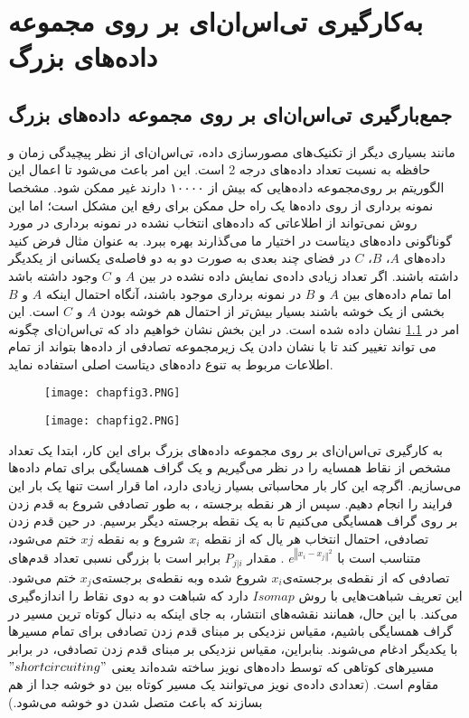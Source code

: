 \chapter{ به‌کارگیری تی‌اس‌ان‌ای بر روی مجموعه داده‌های بزرگ}
\section*{جمع‌بارگیری تی‌اس‌ان‌ای بر روی مجموعه داده‌های بزرگ}
مانند بسیاری دیگر از تکنیک‌های مصورسازی داده، تی‌اس‌ان‌ای از نظر پیچیدگی زمان و حافظه به نسبت تعداد داده‌های درجه 2 است. این امر باعث می‌شود تا اعمال این الگوریتم بر روی‌مجموعه داده‌هایی که بیش از ۱۰۰۰۰ دارند غیر ممکن شود. مشخصا نمونه برداری از روی داده‌ها یک راه حل ممکن برای رفع این مشکل است؛ اما این روش نمی‌تواند از اطلاعاتی که داده‌های انتخاب نشده در نمونه برداری در مورد گوناگونی داده‌های دیتاست در اختیار ما می‌گذارند بهره ببرد. به عنوان مثال فرض کنید داده‌های
 $A$، $B$، $C$
  در فضای چند بعدی به صورت دو به دو فاصله‌ی یکسانی از یکدیگر داشته باشند. اگر تعداد زیادی داده‌ی نمایش داده نشده در بین $A$ و $C$ وجود داشته باشد اما تمام داده‌های بین $A$ و $B$ در نمونه برداری موجود باشند، آنگاه احتمال اینکه $A$ و $B$ بخشی از یک خوشه باشند بسیار بیش‌تر از احتمال هم خوشه بودن $A$ و $C$ است. این امر در \cref{chapfig3} نشان داده شده است. در این بخش نشان خواهیم داد که تی‌اس‌ان‌ای چگونه می تواند تغییر کند تا با نشان دادن یک زیرمجموعه تصادفی از داده‌ها بتواند از تمام اطلاعات مربوط به تنوع داده‌های دیتاست اصلی استفاده نماید.
\\

\begin{figure}
	\centering\texttt{[image: chapfig3.PNG]}
	\caption{ }\label{chapfig3}
\end{figure}
\begin{figure}
	\centering\texttt{[image: chapfig2.PNG]}
	\caption{ }\label{chapfig2}
\end{figure}


به کارگیری تی‌اس‌ان‌ای بر روی مجموعه داده‌های بزرگ
برای این‌ کار، ابتدا یک تعداد مشخص از نقاط همسایه را در نظر می‌گیریم و یک گراف همسایگی برای تمام داده‌ها می‌سازیم. اگرچه این کار بار محاسباتی بسیار زیادی دارد، اما قرار است تنها یک بار این فرایند را انجام دهیم. سپس از هر نقطه برجسته ، به طور تصادفی شروع به قدم زدن بر روی گراف همسایگی می‌کنیم تا به یک نقطه برجسته دیگر برسیم. در حین قدم زدن تصادفی، احتمال انتخاب هر یال که از نقطه
 $x_i$
  شروع و به نقطه $xj$ ختم می‌شود، متناسب است با
$e^{‖x_i-x_j ‖^2}$
. مقدار
$ P_{j|i}$
 برابر است با بزرگی نسبی تعداد قدم‌های تصادفی که از نقطه‌ی برجسته‌ی$ x_i$ شروع شده وبه نقطه‌ی برجسته‌ی$ x_j$ ختم می‌شود. این تعریف شباهت‌هایی با روش $Isomap$ دارد که شباهت دو به دوی نقاط را اندازه‌گیری می‌کند. با این حال، همانند نقشه‌های انتشار، به جای اینکه به دنبال کوتاه ترین مسیر در گراف همسایگی باشیم، مقیاس نزدیکی بر مبنای قدم زدن تصادفی برای تمام مسیرها با یکدیگر ادغام می‌شوند. بنابراین، مقیاس نزدیکی بر مبنای قدم زدن تصادفی، در برابر مسیرهای کوتاهی که توسط داده‌های نویز ساخته شده‌اند یعنی $"short circuiting"$مقاوم است. (تعدادی داده‌ی نویز می‌توانند یک مسیر کوتاه بین دو خوشه جدا از هم بسازند که باعث متصل شدن دو خوشه می‌شود.)



